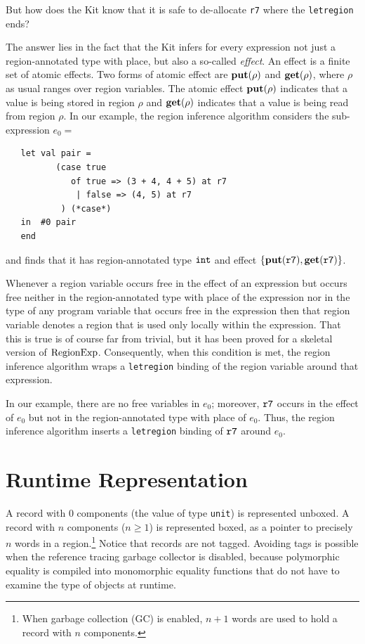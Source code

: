 \documentclass[12pt]{book}
\begin{document}
But how does the Kit know that it is safe to 
%
de-allocate {\tt r7} where the
%
{\tt letregion} ends?


The answer lies in the fact that the Kit infers for every expression
not just a region-annotated type with place, but also a so-called 
%
{\em effect}.  An effect is a finite set of 
%
atomic effects. Two forms of atomic effect are
%
$\mathop{\bf put}\nolimits(\rho)$ and 
%
$\mathop{\bf get}\nolimits(\rho)$, where $\rho$ as usual ranges over region variables. The
atomic effect $\mathop{\bf put}\nolimits(\rho)$ indicates that a value is being stored in
region $\rho$ and $\mathop{\bf get}\nolimits(\rho)$ indicates that a value is being read
from region $\rho$.  In our example, the region inference algorithm
considers the sub-expression $e_0 = $
\begin{verbatim}
   let val pair = 
          (case true 
             of true => (3 + 4, 4 + 5) at r7 
              | false => (4, 5) at r7
           ) (*case*) 
   in  #0 pair
   end  
\end{verbatim}
and finds that it has region-annotated type $\hbox{\tt int}$ and effect
$\{\mathop{\bf put}\nolimits(\hbox{\tt r7}), \mathop{\bf get}\nolimits(\hbox{\tt r7})\}$.

Whenever a region variable occurs free in the effect of an expression
but occurs free neither in the region-annotated type with place of the
expression nor in the type of any program variable that occurs free in
the expression then that region variable denotes a region that is used
only locally within the expression.  That this is true is of course
far from trivial, but it has been proved for a skeletal version of
$\hbox{\rm RegionExp}$.  Consequently, when this condition is met, the region
inference algorithm wraps a 
%
{\tt letregion} binding of the region variable around that expression.

In our example, there are no free variables in $e_0$; moreover,
$\hbox{\tt r7}$ occurs in the effect of $e_0$ but not in the
region-annotated type with place of $e_0$. Thus, the region inference
algorithm inserts a {\tt letregion} binding of $\hbox{\tt r7}$ around
$e_0$.

\section{Runtime Representation}
A 
%
record with 0 components (the value of type
%
{\tt unit}) is represented unboxed.  A record with $n$ components
($n\geq 1$) is represented boxed, as a pointer to precisely $n$ words
in a region.\footnote{When garbage collection (GC) is enabled, $n+1$
  words are used to hold a record with $n$ components.}  Notice that
records are not tagged. Avoiding tags is possible when the reference
tracing garbage collector is disabled, because
%
polymorphic equality is compiled into
%
monomorphic equality functions that do not have to examine the type of
objects at runtime.
\end{document}
